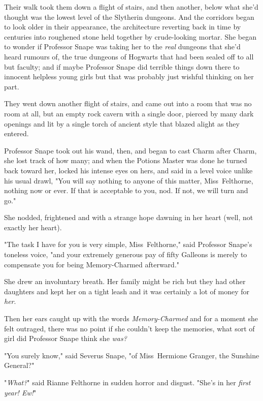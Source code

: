 Their walk took them down a flight of stairs, and then another, below what
she'd thought was the lowest level of the Slytherin dungeons. And the corridors
began to look older in their appearance, the architecture reverting back in
time by centuries into roughened stone held together by crude-looking mortar.
She began to wonder if Professor Snape was taking her to the \emph{real}
dungeons that she'd heard rumours of, the true dungeons of Hogwarts that had
been sealed off to all but faculty; and if maybe Professor Snape did terrible
things down there to innocent helpless young girls but that was probably just
wishful thinking on her part.

They went down another flight of stairs, and came out into a room that was no
room at all, but an empty rock cavern with a single door, pierced by many dark
openings and lit by a single torch of ancient style that blazed alight as they entered.

Professor Snape took out his wand, then, and began to cast Charm after Charm,
she lost track of how many; and when the Potions Master was done he turned back
toward her, locked his intense eyes on hers, and said in a level voice unlike
his usual drawl, "You will say nothing to anyone of this matter,
Miss~Felthorne, nothing now or ever. If that is acceptable to you, nod. If not, we
will turn and go."

She nodded, frightened and with a strange hope dawning in her heart (well, not
exactly her heart).

"The task I have for you is very simple, Miss~Felthorne," said Professor
Snape's toneless voice, "and your extremely generous pay of fifty Galleons is
merely to compensate you for being Memory-Charmed afterward."

She drew an involuntary breath. Her family might be rich but they had other
daughters and kept her on a tight leash and it was certainly a lot of money for
\emph{her}.

Then her ears caught up with the words \emph{Memory-Charmed} and for a moment
she felt outraged, there was no point if she couldn't keep the memories, what
sort of girl did Professor Snape think she \emph{was?}

"You surely know," said Severus Snape, "of Miss~Hermione Granger, the Sunshine
General?"

"\emph{What?}" said Rianne Felthorne in sudden horror and disgust. "She's in
her \emph{first year! Ew!}"
